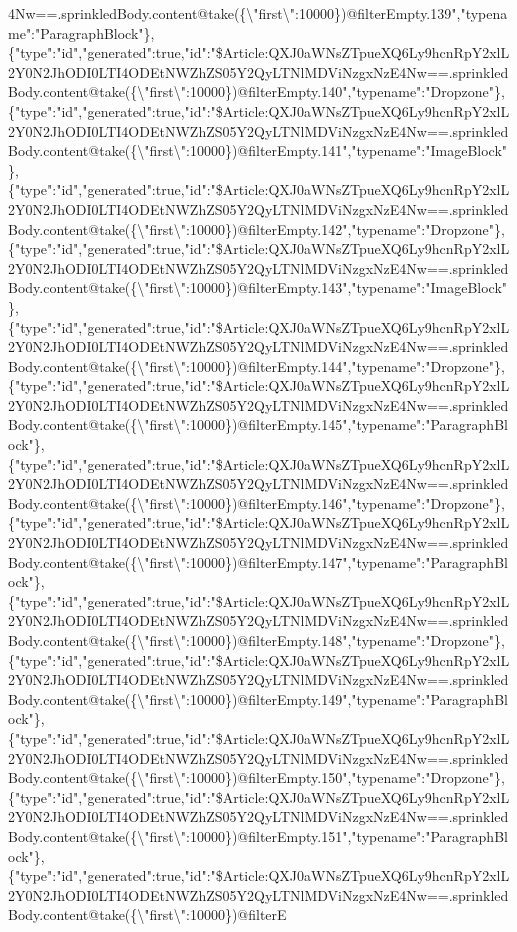 4Nw==.sprinkledBody.content@take(\{\textbackslash{}"first\textbackslash{}":10000\})@filterEmpty.139","typename":"ParagraphBlock"\},\{"type":"id","generated":true,"id":"\$Article:QXJ0aWNsZTpueXQ6Ly9hcnRpY2xlL2Y0N2JhODI0LTI4ODEtNWZhZS05Y2QyLTNlMDViNzgxNzE4Nw==.sprinkledBody.content@take(\{\textbackslash{}"first\textbackslash{}":10000\})@filterEmpty.140","typename":"Dropzone"\},\{"type":"id","generated":true,"id":"\$Article:QXJ0aWNsZTpueXQ6Ly9hcnRpY2xlL2Y0N2JhODI0LTI4ODEtNWZhZS05Y2QyLTNlMDViNzgxNzE4Nw==.sprinkledBody.content@take(\{\textbackslash{}"first\textbackslash{}":10000\})@filterEmpty.141","typename":"ImageBlock"\},\{"type":"id","generated":true,"id":"\$Article:QXJ0aWNsZTpueXQ6Ly9hcnRpY2xlL2Y0N2JhODI0LTI4ODEtNWZhZS05Y2QyLTNlMDViNzgxNzE4Nw==.sprinkledBody.content@take(\{\textbackslash{}"first\textbackslash{}":10000\})@filterEmpty.142","typename":"Dropzone"\},\{"type":"id","generated":true,"id":"\$Article:QXJ0aWNsZTpueXQ6Ly9hcnRpY2xlL2Y0N2JhODI0LTI4ODEtNWZhZS05Y2QyLTNlMDViNzgxNzE4Nw==.sprinkledBody.content@take(\{\textbackslash{}"first\textbackslash{}":10000\})@filterEmpty.143","typename":"ImageBlock"\},\{"type":"id","generated":true,"id":"\$Article:QXJ0aWNsZTpueXQ6Ly9hcnRpY2xlL2Y0N2JhODI0LTI4ODEtNWZhZS05Y2QyLTNlMDViNzgxNzE4Nw==.sprinkledBody.content@take(\{\textbackslash{}"first\textbackslash{}":10000\})@filterEmpty.144","typename":"Dropzone"\},\{"type":"id","generated":true,"id":"\$Article:QXJ0aWNsZTpueXQ6Ly9hcnRpY2xlL2Y0N2JhODI0LTI4ODEtNWZhZS05Y2QyLTNlMDViNzgxNzE4Nw==.sprinkledBody.content@take(\{\textbackslash{}"first\textbackslash{}":10000\})@filterEmpty.145","typename":"ParagraphBlock"\},\{"type":"id","generated":true,"id":"\$Article:QXJ0aWNsZTpueXQ6Ly9hcnRpY2xlL2Y0N2JhODI0LTI4ODEtNWZhZS05Y2QyLTNlMDViNzgxNzE4Nw==.sprinkledBody.content@take(\{\textbackslash{}"first\textbackslash{}":10000\})@filterEmpty.146","typename":"Dropzone"\},\{"type":"id","generated":true,"id":"\$Article:QXJ0aWNsZTpueXQ6Ly9hcnRpY2xlL2Y0N2JhODI0LTI4ODEtNWZhZS05Y2QyLTNlMDViNzgxNzE4Nw==.sprinkledBody.content@take(\{\textbackslash{}"first\textbackslash{}":10000\})@filterEmpty.147","typename":"ParagraphBlock"\},\{"type":"id","generated":true,"id":"\$Article:QXJ0aWNsZTpueXQ6Ly9hcnRpY2xlL2Y0N2JhODI0LTI4ODEtNWZhZS05Y2QyLTNlMDViNzgxNzE4Nw==.sprinkledBody.content@take(\{\textbackslash{}"first\textbackslash{}":10000\})@filterEmpty.148","typename":"Dropzone"\},\{"type":"id","generated":true,"id":"\$Article:QXJ0aWNsZTpueXQ6Ly9hcnRpY2xlL2Y0N2JhODI0LTI4ODEtNWZhZS05Y2QyLTNlMDViNzgxNzE4Nw==.sprinkledBody.content@take(\{\textbackslash{}"first\textbackslash{}":10000\})@filterEmpty.149","typename":"ParagraphBlock"\},\{"type":"id","generated":true,"id":"\$Article:QXJ0aWNsZTpueXQ6Ly9hcnRpY2xlL2Y0N2JhODI0LTI4ODEtNWZhZS05Y2QyLTNlMDViNzgxNzE4Nw==.sprinkledBody.content@take(\{\textbackslash{}"first\textbackslash{}":10000\})@filterEmpty.150","typename":"Dropzone"\},\{"type":"id","generated":true,"id":"\$Article:QXJ0aWNsZTpueXQ6Ly9hcnRpY2xlL2Y0N2JhODI0LTI4ODEtNWZhZS05Y2QyLTNlMDViNzgxNzE4Nw==.sprinkledBody.content@take(\{\textbackslash{}"first\textbackslash{}":10000\})@filterEmpty.151","typename":"ParagraphBlock"\},\{"type":"id","generated":true,"id":"\$Article:QXJ0aWNsZTpueXQ6Ly9hcnRpY2xlL2Y0N2JhODI0LTI4ODEtNWZhZS05Y2QyLTNlMDViNzgxNzE4Nw==.sprinkledBody.content@take(\{\textbackslash{}"first\textbackslash{}":10000\})@filterE